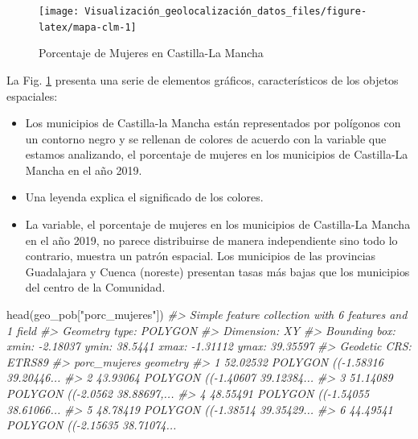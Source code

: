 \documentclass[
]{book}
\newenvironment{Shaded}{\begin{snugshade}}{\end{snugshade}}
\newcommand{\CommentTok}[1]{\textcolor[rgb]{0.56,0.35,0.01}{\textit{#1}}}
\newcommand{\FunctionTok}[1]{\textcolor[rgb]{0.00,0.00,0.00}{#1}}
\newcommand{\NormalTok}[1]{#1}
\newcommand{\StringTok}[1]{\textcolor[rgb]{0.31,0.60,0.02}{#1}}
\theoremstyle{definition}
\theoremstyle{definition}
\theoremstyle{definition}
\theoremstyle{definition}
\theoremstyle{remark}
\begin{document}
\begin{figure}

{\centering \texttt{[image: Visualización\_geolocalización\_datos\_files/figure-latex/mapa-clm-1]} 

}

\caption{Porcentaje de Mujeres en Castilla-La Mancha}\label{fig:mapa-clm}
\end{figure}

La Fig. \ref{fig:mapa-clm} presenta una serie de elementos gráficos,
característicos de los objetos espaciales:

\begin{itemize}
\item
  Los municipios de Castilla-la Mancha están representados por polígonos con
  un contorno negro y se rellenan de colores de acuerdo con la variable que
  estamos analizando, el porcentaje de mujeres en los municipios de
  Castilla-La Mancha en el año 2019.
\item
  Una leyenda explica el significado de los colores.
\item
  La variable, el porcentaje de mujeres en los municipios de Castilla-La
  Mancha en el año 2019, no parece distribuirse de manera independiente sino
  todo lo contrario, muestra un patrón espacial. Los municipios de las
  provincias Guadalajara y Cuenca (noreste) presentan tasas más bajas que los
  municipios del centro de la Comunidad.
\end{itemize}

\begin{Shaded}
\begin{Highlighting}[]
\FunctionTok{head}\NormalTok{(geo\_pob[}\StringTok{"porc\_mujeres"}\NormalTok{])}
\CommentTok{\#\textgreater{} Simple feature collection with 6 features and 1 field}
\CommentTok{\#\textgreater{} Geometry type: POLYGON}
\CommentTok{\#\textgreater{} Dimension:     XY}
\CommentTok{\#\textgreater{} Bounding box:  xmin: {-}2.18037 ymin: 38.5441 xmax: {-}1.31112 ymax: 39.35597}
\CommentTok{\#\textgreater{} Geodetic CRS:  ETRS89}
\CommentTok{\#\textgreater{}   porc\_mujeres                       geometry}
\CommentTok{\#\textgreater{} 1     52.02532 POLYGON (({-}1.58316 39.20446...}
\CommentTok{\#\textgreater{} 2     43.93064 POLYGON (({-}1.40607 39.12384...}
\CommentTok{\#\textgreater{} 3     51.14089 POLYGON (({-}2.0562 38.88697,...}
\CommentTok{\#\textgreater{} 4     48.55491 POLYGON (({-}1.54055 38.61066...}
\CommentTok{\#\textgreater{} 5     48.78419 POLYGON (({-}1.38514 39.35429...}
\CommentTok{\#\textgreater{} 6     44.49541 POLYGON (({-}2.15635 38.71074...}
\end{Highlighting}
\end{Shaded}
\end{document}
